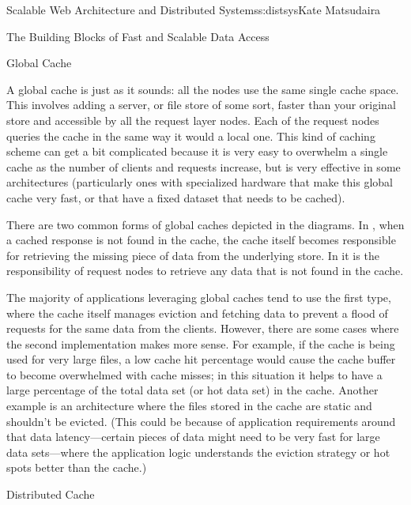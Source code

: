 \begin{aosachapter}{Scalable Web Architecture and Distributed Systems}{s:distsys}{Kate Matsudaira}
\begin{aosasect1}{The Building Blocks of Fast and Scalable Data Access}
\begin{aosasect2}{Global Cache}

A global cache is just as it sounds: all the nodes use the same single cache
space. This involves adding a server, or file store of some sort,
faster than your original store and accessible by all the request
layer nodes. Each of the request nodes queries the cache in the same
way it would a local one. This kind of caching scheme can get a bit
complicated because it is very easy to overwhelm a single cache as the
number of clients and requests increase, but is very effective in some
architectures (particularly ones with specialized hardware that make
this global cache very fast, or that have a fixed dataset that needs to be
cached).



There are two common forms of global caches depicted in the
diagrams. In , when a cached response is not found in
the cache, the cache itself becomes responsible for retrieving the
missing piece of data from the underlying store. In 
it is the responsibility of request nodes to retrieve any data that is
not found in the cache.

The majority of applications leveraging global caches tend to use the
first type, where the cache itself manages eviction and fetching data to
prevent a flood of requests for the same data from the
clients. However, there are some cases where the second
implementation makes more sense. For example, if the cache is being
used for very large files, a low cache hit percentage would cause the
cache buffer to become overwhelmed with cache misses; in this
situation it helps to have a large percentage of the total data set
(or hot data set) in the cache. Another example is an architecture where
the files stored in the cache are static and shouldn't be evicted.
(This could be because of application requirements around that data 
latency---certain pieces of data might need to be very fast for large
data sets---where the application logic understands the eviction
strategy or hot spots better than the cache.)

\end{aosasect2}

\begin{aosasect2}{Distributed Cache}


\end{aosasect2}
\end{aosasect1}
\end{aosachapter}
